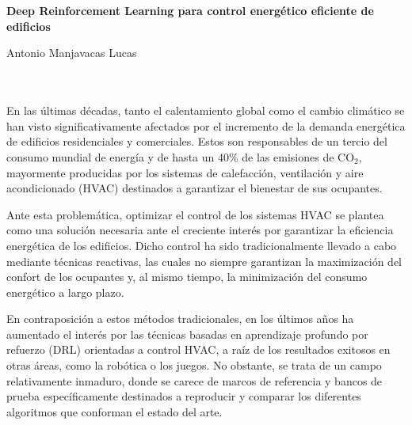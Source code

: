 \chapter*{}



\cleardoublepage
\thispagestyle{empty}

\begin{center}
{\large\bfseries Deep Reinforcement Learning para control energético eficiente de edificios}\\
\end{center}
\begin{center}
Antonio Manjavacas Lucas\\
\end{center}

\\

\vspace{0.7cm}
\\

En las últimas décadas, tanto el calentamiento global como el cambio climático se han visto significativamente afectados por el incremento de la demanda energética de edificios residenciales y comerciales. Estos son responsables de un tercio del consumo mundial de energía y de hasta un 40\% de las emisiones de CO$_2$, mayormente producidas por los sistemas de calefacción, ventilación y aire acondicionado (HVAC) destinados a garantizar el bienestar de sus ocupantes.

Ante esta problemática, optimizar el control de los sistemas HVAC se plantea como una solución necesaria ante el creciente interés por garantizar la eficiencia energética de los edificios. Dicho control ha sido tradicionalmente llevado a cabo mediante técnicas reactivas, las cuales no siempre garantizan la maximización del confort de los ocupantes y, al mismo tiempo, la minimización del consumo energético a largo plazo.

En contraposición a estos métodos tradicionales, en los últimos años ha aumentado el interés por las técnicas basadas en aprendizaje profundo por refuerzo (DRL) orientadas a control HVAC, a raíz de los resultados exitosos en otras áreas, como la robótica o los juegos. No obstante, se trata de un campo relativamente inmaduro, donde se carece de marcos de referencia y bancos de prueba específicamente destinados a reproducir y comparar los diferentes algoritmos que conforman el estado del arte.

